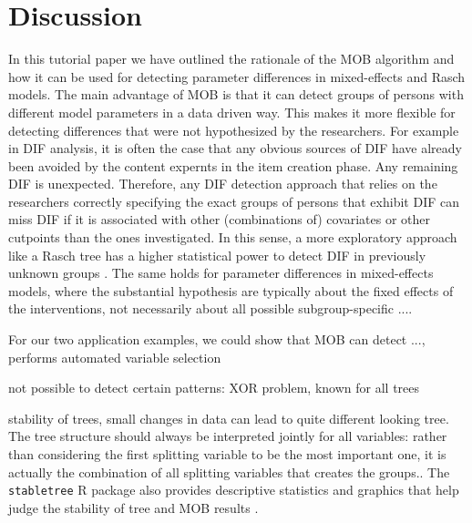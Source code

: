 \documentclass[doc,floatsintext,natbib]{apa7}
\begin{document}

\FloatBarrier
\section{Discussion}

In this tutorial paper we have outlined the rationale of the MOB algorithm and how it can be used for detecting parameter differences in mixed-effects and Rasch models. The main advantage of MOB is that it can detect groups of persons with different model parameters in a data driven way. This makes it more flexible for detecting differences that were not hypothesized by the researchers. For example in DIF analysis, it is often the case that any obvious sources of DIF have already been avoided by the content expernts in the item creation phase. Any remaining DIF is unexpected. Therefore, any DIF detection approach that relies on the researchers correctly specifying the exact groups of persons that exhibit DIF can miss DIF if it is associated with other (combinations of) covariates or other cutpoints than the ones investigated. In this sense, a more exploratory approach like a Rasch tree has a higher statistical power to detect DIF in previously unknown groups \citep{StrKopZei:2015:P}. The same holds for parameter differences in mixed-effects models, where the substantial hypothesis are typically about the fixed effects of the interventions, not necessarily about all possible subgroup-specific .... 


For our two application examples, we could show that MOB can detect ..., performs automated variable selection  


not possible to detect certain patterns: XOR problem, known for all trees

stability of trees, small changes in data can lead to quite different looking tree. The tree structure should always be interpreted jointly for all variables: rather than considering the first splitting variable to be the most important one, it is actually the combination of all splitting variables that creates the groups.. The \texttt{stabletree} R package also provides descriptive statistics and graphics that help judge the stability of tree and MOB results \citep{PhiRusHor:2018:JoCaGS,PhiZeiStr:2016}. 
\end{document}
